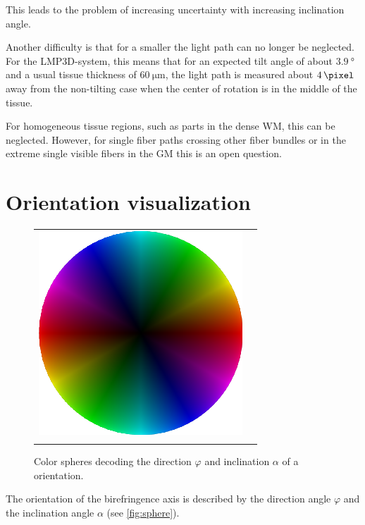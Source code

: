 This leads to the problem of increasing uncertainty with increasing inclination angle.
\par
%
Another difficulty is that for a smaller \Pixelsize{} the light path can no longer be neglected.
For the \ac{LMP3D}-system, this means that for an expected tilt angle of about $\SI{3.9}{\degree}$ and a usual tissue thickness of $\SI{60}{\micro\meter}$, the light path is measured about $\SI{4}{\pixel}$ away from the non-tilting case when the center of rotation is in the middle of the tissue.
\par
%
For homogeneous tissue regions, such as parts in the dense \ac{WM}, this can be neglected.
However, for single fiber paths crossing other fiber bundles or in the extreme single visible fibers in the \ac{GM} this is an open question.
%
%
%
\section{Orientation visualization}
%
\begin{figure}[!t]
\centering
\setlength{\tikzwidth}{0.8\textwidth}
\setlength{\tabcolsep}{0pt}
\begin{tabular}{M{0.5\textwidth}M{0.5\textwidth}}
\includegraphics[width=0.41\tikzwidth]{gfx/pli/color_sphere.png} &
\\
 &
\end{tabular}
%
\caption{Color spheres decoding the direction $\varphi$ and inclination $\alpha$ of a orientation.}
\label{fig:spheres}
\end{figure}
%
%
The orientation of the birefringence axis is described by the direction angle $\varphi$ and the inclination angle $\alpha$ (see \cref{fig:sphere}).
